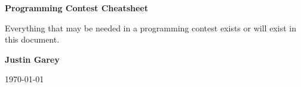 \begin{titlepage}

    \begin{center}


        \vspace*{\fill}

        \Huge

        \textbf{Programming Contest Cheatsheet}
        

        \vspace{0.5cm}

            Everything that may be needed in a programming contest exists or will exist in this document. 
            
        \vspace{0.5cm}

        \textbf{Justin Garey}

        \vspace{0.5cm}

        \today  
        
        \vspace*{\fill}

    \end{center}
    
 \end{titlepage}